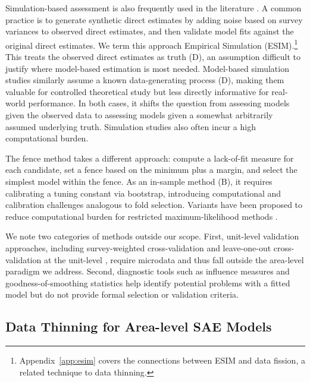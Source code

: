 \documentclass[11pt]{article}
\theoremstyle{plain}
\theoremstyle{definition}
\theoremstyle{remark}
\begin{document}
Simulation-based assessment is also frequently used in the literature \citep{bradley_multivariate_2015, janicki_bayesian_2022}. A common practice is to generate synthetic direct estimates by adding noise based on survey variances to observed direct estimates, and then validate model fits against the original direct estimates. We term this approach Empirical Simulation (ESIM).\footnote{Appendix~\ref{app:esim} covers the connections between ESIM and data fission, a related technique to data thinning.} This treats the observed direct estimates as truth (D), an assumption difficult to justify where model-based estimation is most needed. Model-based simulation studies similarly assume a known data-generating process (D), making them valuable for controlled theoretical study but less directly informative for real-world performance. In both cases, it shifts the question from assessing models given the observed data to assessing models given a somewhat arbitrarily assumed underlying truth. Simulation studies also often incur a high computational burden.

The fence method \citep{jiang_fence_2008} takes a different approach: compute a lack-of-fit measure for each candidate, set a fence based on the minimum plus a margin, and select the simplest model within the fence. As an in-sample method (B), it requires calibrating a tuning constant via bootstrap, introducing computational and calibration challenges analogous to fold selection. Variants have been proposed to reduce computational burden for restricted maximum-likelihood methods \citep{nguyen_restricted_2012}.

We note two categories of methods outside our scope. First, unit-level validation approaches, including survey-weighted cross-validation \citep{wieczorek_k-fold_2022} and leave-one-out cross-validation at the unit-level \citep{kuh_using_2024}, require microdata and thus fall outside the area-level paradigm we address. Second, diagnostic tools such as influence measures \citep{marcis_three-fold_2023} and goodness-of-smoothing statistics \citep{duncan_comparing_2020} help identify potential problems with a fitted model but do not provide formal selection or validation criteria.

\subsection{Data Thinning for Area-level SAE Models}
\end{document}
